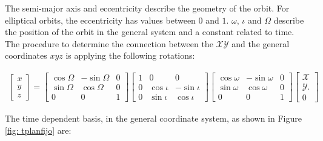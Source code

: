 The semi-major axis and eccentricity describe the geometry of the orbit. For elliptical orbits, the eccentricity has values between $0$ and $1$. $\omega$, $\iota$ and $\Omega$ describe the position of the orbit in the general system and a constant related to time.\\

The procedure to determine the connection between the $\mathcal{X}\mathcal{Y}$ and the general coordinates $xyz$ is applying the following rotations:

\begin{align}
\begin{bmatrix}
x\\
y\\
z\end{bmatrix}
= 
\begin{bmatrix}
\cos \Omega & -\sin \Omega & 0 \\
\sin \Omega & \cos\Omega & 0\\
0&0&1
\end{bmatrix}
\begin{bmatrix}
1&0&0\\
0&\cos \iota & -\sin \iota \\
0& \sin \iota & \cos\iota 
\end{bmatrix}
\begin{bmatrix}
\cos \omega & -\sin {\omega} & 0 \\
\sin \omega & \cos\omega & 0\\
0&0&1
\end{bmatrix}
\begin{bmatrix}
\mathcal{X}\\
\mathcal{Y}.\\
0\end{bmatrix}
\end{align}

The time dependent basis, in the general coordinate system, as shown in Figure \ref{fig: tplanfijo} are:\\


